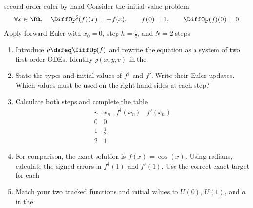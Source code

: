 \documentclass[12pt]{article}
\begin{document}
\begin{eg}{second-order-euler-by-hand}
  Consider the initial-value problem
  \[
    \forall x\in\RR,\quad \DiffOp^2(f)(x)=-f(x),\qquad
    f(0)=1,\qquad \DiffOp(f)(0)=0
  \]
  Apply forward Euler with $x_0=0$, step $h=\frac12$, and $N=2$ steps
  \begin{enumerate}
    \item Introduce $v\defeq\DiffOp(f)$ and rewrite the equation as a
      system of two first-order ODEs. Identify $g(x,y,v)$ in the
    \item State the types and initial values of $f^\dagger$ and $f'$.
      Write their Euler updates. Which values must be used on the
      right-hand sides at each step?
    \item Calculate both steps and complete the table
      \[
        \begin{array}{c|c|c|c}
          n & x_n & f^\dagger(x_n) & f'(x_n)\\
          \hline
          0 & 0       & \phantom{00000} & \phantom{00000}\\
          1 & \frac12 &                 &                 \\
          2 & 1       &                 &
        \end{array}
      \]
    \item For comparison, the exact solution is $f(x)=\cos(x)$.
      Using radians, calculate the signed errors in $f^\dagger(1)$
      and $f'(1)$. Use the correct exact target for each
    \item Match your two tracked functions and initial values to
      $U(0)$, $U(1)$, and $a$ in the
  \end{enumerate}

\end{eg}
\end{document}
